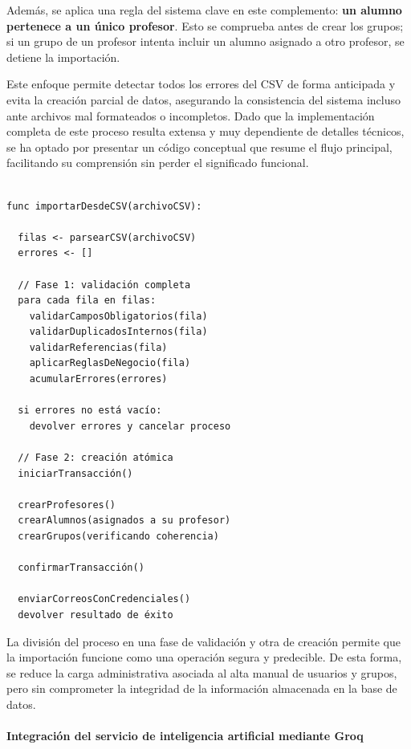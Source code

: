 Además, se aplica una regla del sistema clave en este complemento: \textbf{un alumno pertenece a un único profesor}. Esto se comprueba antes de crear los grupos; si un grupo de un profesor intenta incluir un alumno asignado a otro profesor, se detiene la importación.

Este enfoque permite detectar todos los errores del CSV de forma anticipada y evita la creación parcial de datos, asegurando la consistencia del sistema incluso ante archivos mal formateados o incompletos. Dado que la implementación completa de este proceso resulta extensa y muy dependiente de detalles técnicos, se ha optado por presentar un código conceptual que resume el flujo principal, facilitando su comprensión sin perder el significado funcional.

\begin{Verbatim}[frame=single, fontsize=\small, xleftmargin=10pt, xrightmargin=10pt]

func importarDesdeCSV(archivoCSV):

  filas <- parsearCSV(archivoCSV)
  errores <- []

  // Fase 1: validación completa
  para cada fila en filas:
    validarCamposObligatorios(fila)
    validarDuplicadosInternos(fila)
    validarReferencias(fila)
    aplicarReglasDeNegocio(fila)
    acumularErrores(errores)

  si errores no está vacío:
    devolver errores y cancelar proceso

  // Fase 2: creación atómica
  iniciarTransacción()

  crearProfesores()
  crearAlumnos(asignados a su profesor)
  crearGrupos(verificando coherencia)

  confirmarTransacción()

  enviarCorreosConCredenciales()
  devolver resultado de éxito
\end{Verbatim}

La división del proceso en una fase de validación y otra de creación permite que la importación funcione como una operación segura y predecible. De esta forma, se reduce la carga administrativa asociada al alta manual de usuarios y grupos, pero sin comprometer la integridad de la información almacenada en la base de datos.

\paragraph{Integración del servicio de inteligencia artificial mediante Groq}

